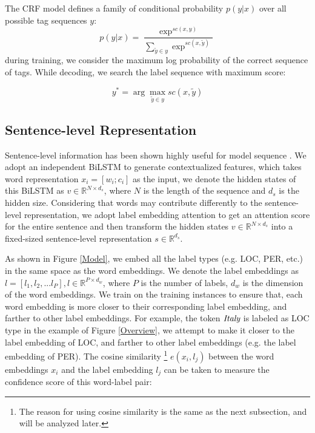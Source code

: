 \documentclass[letterpaper]{article} \usepackage{aaai20}  \usepackage{times}  \usepackage{helvet} \usepackage{courier}  \usepackage[hyphens]{url}  \usepackage{graphicx} \urlstyle{rm} \def\UrlFont{\rm}  \usepackage{graphicx}  \frenchspacing  \setlength{\pdfpagewidth}{8.5in}  \setlength{\pdfpageheight}{11in}
\begin{document}
The CRF model defines a family of conditional probability $p(y|x)$ over all possible tag sequences $y$:
\begin{equation} 
p(y|x) = \frac{\exp^{sc(x,y)}}{\sum_{\tilde{y}\in y}\exp^{sc(x, \tilde{y})}} 
\end{equation}
during training, we consider the maximum log probability
of the correct sequence of tags. 
While decoding, we search the label sequence with maximum score:

\begin{equation}  
y^{*} = \arg\max_{\tilde{y} \in y} sc(x, \tilde{y})
\end{equation}

\subsection{Sentence-level Representation} 
Sentence-level  information has been shown highly
useful for model sequence \cite{zhang2018sentence,liu2019gcdt}.
We adopt an independent BiLSTM to generate contextualized features, which takes word representation $x_i=[w_i;c_i]$ as the input, we denote the hidden states of this BiLSTM as $v \in \mathbb{R}^{N \times d_s}$, where $N$ is the length of the sequence and $d_s$ is the hidden size. 
Considering that words may contribute differently to the sentence-level representation, we adopt label embedding attention \cite{wang2018joint} to get an attention score for the entire sentence and then transform the hidden states $v \in \mathbb{R}^{N \times d_s}$ into a fixed-sized sentence-level representation $s \in \mathbb{R} ^{d_s} $.  

As shown in Figure \ref{Model}, we embed all the label types (e.g. LOC, PER, etc.) in the same space as the word embeddings. We denote the label embeddings as $l = [l_1, l_2, ... l_P], l \in \mathbb{R}^{P \times d_w} $, where  $P$ is the number of labels, $d_w$ is the dimension of the word embeddings. 
We train on the training instances to ensure that, each word embedding is more closer to their corresponding label embedding, and farther to other label embeddings. 
For example, the token $\emph{Italy}$ is labeled as LOC type in the example of Figure \ref{Overview}, we attempt to make it closer to the label embedding of LOC, and farther to other label embeddings (e.g. the label embedding of PER).
The cosine similarity
\footnote{The reason for using cosine similarity is the same as the next subsection, and will be analyzed later.} 
$e(x_i, l_j)$ between the word embeddings $x_i$ and the label embedding $l_j$ can be taken to measure the confidence score of this word-label pair:
\end{document}
